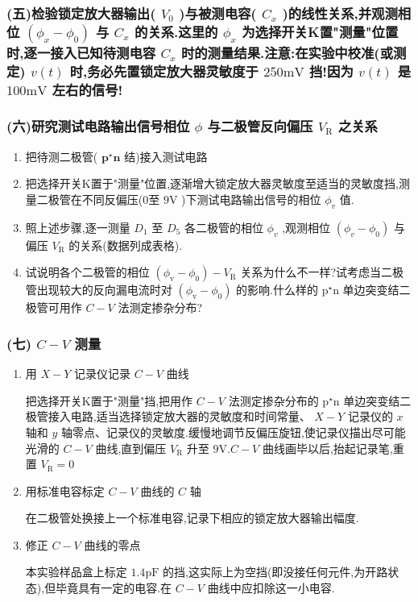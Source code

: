 \documentclass[12pt,a4paper]{article}
\begin{document}
\subsubsection*{(五)检验锁定放大器输出( \(V_{0}\) )与被测电容( \(C_{x}\) )的线性关系,并观测相位 \((\phi_{x} - \phi_{0})\) 与 \(C_{x}\) 的关系.这里的 \(\phi_{x}\) 为选择开关K置"测量"位置时,逐一接入已知待测电容 \(C_{x}\) 时的测量结果.注意:在实验中校准(或测定) \(v(t)\) 时,务必先置锁定放大器灵敏度于 \(250\mathrm{mV}\) 挡!因为 \(v(t)\) 是 \(100\mathrm{mV}\) 左右的信号!}

\subsubsection*{(六)研究测试电路输出信号相位 \(\phi\) 与二极管反向偏压 \(V_{\mathrm{R}}\) 之关系}
\begin{enumerate}
    \item 把待测二极管( \(\mathbf{p}^{\star}\mathbf{n}\) 结)接入测试电路
    \item 把选择开关K置于"测量"位置,逐渐增大锁定放大器灵敏度至适当的灵敏度挡,测量二极管在不同反偏压(0至 \(9\mathrm{V}\) )下测试电路输出信号的相位 \(\phi_{v}\) 值.
    \item 照上述步骤,逐一测量 \(D_{1}\) 至 \(D_{5}\) 各二极管的相位 \(\phi_{v}\) ,观测相位 \((\phi_{v} - \phi_{0})\) 与偏压 \(V_{\mathrm{R}}\) 的关系(数据列成表格).
    \item 试说明各个二极管的相位 \((\phi_{\mathrm{v}} - \phi_{0}) - V_{\mathrm{R}}\) 关系为什么不一样?试考虑当二极管出现较大的反向漏电流时对 \((\phi_{\mathrm{v}} - \phi_{0})\) 的影响.什么样的 \(\mathrm{p}^{\star}\mathrm{n}\) 单边突变结二极管可用作 \(C - V\) 法测定掺杂分布?
\end{enumerate}

\subsubsection*{(七) \(C - V\) 测量}
\begin{enumerate}
    \item 用 \(X - Y\) 记录仪记录 \(C - V\) 曲线

    把选择开关K置于"测量"挡,把用作 \(C - V\) 法测定掺杂分布的 \(\mathrm{p}^{\star}\mathrm{n}\) 单边突变结二极管接入电路,适当选择锁定放大器的灵敏度和时间常量、 \(X - Y\) 记录仪的 \(x\) 轴和 \(y\) 轴零点、记录仪的灵敏度.缓慢地调节反偏压旋钮,使记录仪描出尽可能光滑的 \(C - V\) 曲线,直到偏压 \(V_{\mathrm{R}}\) 升至 \(9\mathrm{V}.C - V\) 曲线画毕以后,抬起记录笔,重置 \(V_{\mathrm{R}} = 0\)

    \item 用标准电容标定 \(C - V\) 曲线的 \(C\) 轴

    在二极管处换接上一个标准电容,记录下相应的锁定放大器输出幅度.

    \item 修正 \(C - V\) 曲线的零点

    本实验样品盒上标定 \(1.4\mathrm{pF}\) 的挡,这实际上为空挡(即没接任何元件,为开路状态),但毕竟具有一定的电容.在 \(C - V\) 曲线中应扣除这一小电容.
\end{enumerate}
\end{document}
